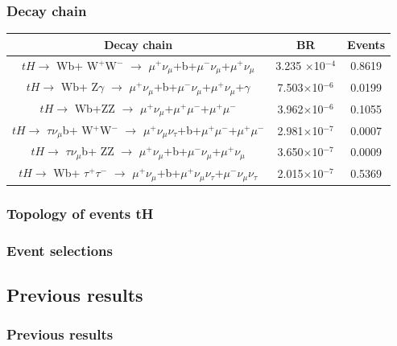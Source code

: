 \documentclass[11pt]{beamer}
\begin{document}
\begin{frame}
\frametitle{Decay chain}
\begin{tabular}{|c|c|c|}
\hline
Decay chain &BR&Events\\
\hline
\tiny{$tH \rightarrow$ Wb+ W$^+$W$^-$ $\rightarrow$ $\mu^+ \nu_\mu$+b+$\mu^- \nu_\mu$+$\mu^+ \nu_\mu$} &3.235 $\times$10$^{-4}$ &0.8619\\
\hline
\tiny{$tH \rightarrow$ Wb+ Z$\gamma$ $\rightarrow$ $\mu^+ \nu_\mu$+b+$\mu^- \nu_\mu$+$\mu^+ \nu_\mu$+$\gamma$} &7.503$\times$10$^{-6}$ &0.0199\\
\hline
\tiny{$tH \rightarrow$ Wb+ZZ $\rightarrow$ $\mu^+ \nu_\mu$+$\mu^+\mu^- $+$\mu^+\mu^- $} &3.962$\times$10$^{-6}$&0.1055\\
\hline
\tiny{$tH \rightarrow$ $\tau \nu_\mu$b+ W$^+$W$^-$ $\rightarrow$ $\mu^+ \nu_\mu \nu_\tau$+b+$\mu^+\mu^- $+$\mu^+\mu^- $} &2.981$\times$10$^{-7}$&0.0007\\
\hline
\tiny{$tH \rightarrow$ $\tau \nu_\mu$b+ ZZ $\rightarrow$ $\mu^+ \nu_\mu$+b+$\mu^- \nu_\mu$+$\mu^+ \nu_\mu$} &3.650$\times$10$^{-7}$&0.0009\\
\hline
\tiny{$tH \rightarrow$ Wb+ $\tau^+ \tau^-$ $\rightarrow$ $\mu^+ \nu_\mu$+b+$\mu^+ \nu_\mu \nu_\tau$+$\mu^- \nu_\mu \nu_\tau$} &2.015$\times$10$^{-7}$&0.5369\\
\hline
\end{tabular}
\end{frame}


\begin{frame}
\frametitle{Topology of events tH}
\end{frame}

\begin{frame}
\frametitle{Event selections}
\end{frame}

\begin{frame}
\section{Previous results}
\frametitle{Previous results}
\end{frame}

\begin{frame}

\end{frame}
\end{document}
